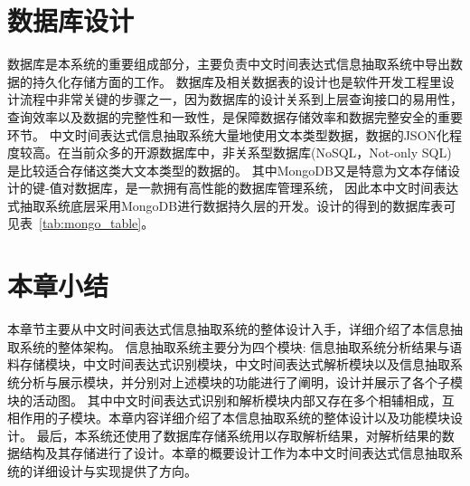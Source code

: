 \section{数据库设计}


数据库是本系统的重要组成部分，主要负责中文时间表达式信息抽取系统中导出数据的持久化存储方面的工作。
数据库及相关数据表的设计也是软件开发工程里设计流程中非常关键的步骤之一，因为数据库的设计关系到上层查询接口的易用性，查询效率以及数据的完整性和一致性，是保障数据存储效率和数据完整安全的重要环节。
中文时间表达式信息抽取系统大量地使用文本类型数据，数据的JSON化程度较高。在当前众多的开源数据库中，非关系型数据库(NoSQL，Not-only SQL)是比较适合存储这类大文本类型的数据的。
其中MongoDB又是特意为文本存储设计的键-值对数据库，是一款拥有高性能的数据库管理系统，
因此本中文时间表达式抽取系统底层采用MongoDB进行数据持久层的开发。设计的得到的数据库表可见表~\ref{tab:mongo_table}。

\section{本章小结}

本章节主要从中文时间表达式信息抽取系统的整体设计入手，详细介绍了本信息抽取系统的整体架构。
信息抽取系统主要分为四个模块: 信息抽取系统分析结果与语料存储模块，中文时间表达式识别模块，中文时间表达式解析模块以及信息抽取系统分析与展示模块，并分别对上述模块的功能进行了阐明，设计并展示了各个子模块的活动图。
其中中文时间表达式识别和解析模块内部又存在多个相辅相成，互相作用的子模块。本章内容详细介绍了本信息抽取系统的整体设计以及功能模块设计。
最后，本系统还使用了数据库存储系统用以存取解析结果，对解析结果的数据结构及其存储进行了设计。本章的概要设计工作为本中文时间表达式信息抽取系统的详细设计与实现提供了方向。
